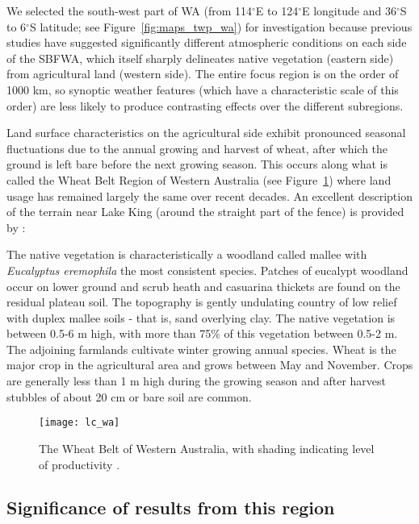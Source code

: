 We selected the south-west part of \ac{WA} (from 114$^\circ$E to 124$^\circ$E longitude and 36$^\circ$S to 6$^\circ$S latitude; see Figure~\ref{fig:maps_twp_wa}) for investigation because previous studies \citep{lyons1993, lyons1996, lyons2002, xinmei1995, ray2003, esau2002} have suggested significantly different atmospheric conditions on each side of the \ac{SBFWA}, which itself sharply delineates native vegetation (eastern side) from agricultural land (western side). The entire focus region is on the order of 1000 km, so synoptic weather features (which have a characteristic scale of this order) are less likely to produce contrasting effects over the different subregions.

Land surface characteristics on the agricultural side exhibit pronounced seasonal fluctuations due to the annual growing and harvest of wheat, after which the ground is left bare before the next growing season. This occurs along what is called the Wheat Belt Region of Western Australia (see Figure~\ref{fig:lc_wa}) where land usage has remained largely the same over recent decades. An excellent description of the terrain near Lake King (around the straight part of the fence) is provided by \citet{lyons2002}:

\begin{displayquote}
	The native vegetation is characteristically a woodland called mallee with \textit{Eucalyptus eremophila} the most consistent species. Patches of eucalypt woodland occur on lower ground and scrub heath and casuarina thickets are found on the residual plateau soil. The topography is gently undulating country of low relief with duplex mallee soils - that is, sand overlying clay. The native vegetation is between 0.5-6 m high, with more than 75\% of this vegetation between 0.5-2 m. The adjoining farmlands cultivate winter growing annual species. Wheat is the major crop in the agricultural area and grows between May and November. Crops are generally less than 1 m high during the growing season and after harvest stubbles of about 20 cm or bare soil are common.
\end{displayquote}

\begin{figure}[!ht]
	\centering
	\texttt{[image: lc\_wa]}
	\caption[Western Australia Land Usage]{The Wheat Belt of Western Australia, with shading indicating level of productivity \citep{lc_wa}.}
	\label{fig:lc_wa}
\end{figure}

\subsection{Significance of results from this region}

